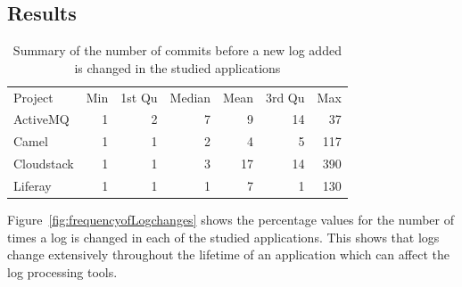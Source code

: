 %	





\subsection{Results}

\begin{table}[tb]
	\centering
	\caption{Summary of the number of commits before a new log added is changed in the studied applications}
	
	\begin{tabular}{lrrrrrr}
			\cline{1-7}
		Project    & Min & 1st Qu & Median & Mean & 3rd Qu & Max \\
		\cline{1-7}
		ActiveMQ   & 1   & 2      & 7      & 9    & 14     & 37  \\
		Camel      & 1   & 1      & 2      & 4    & 5      & 117 \\
		Cloudstack & 1   & 1      & 3      & 17   & 14     & 390 \\
		Liferay    & 1   & 1      & 1      & 7    & 1      & 130\\	\cline{1-7}
		
	\end{tabular}
	\label{tba:summaryofnewLogchange}
\end{table}


Figure~\ref{fig:frequencyofLogchanges} shows the percentage values for the number of times a log is changed in each of the studied applications. This shows that logs change extensively throughout the lifetime of an application which can affect the log processing tools.

